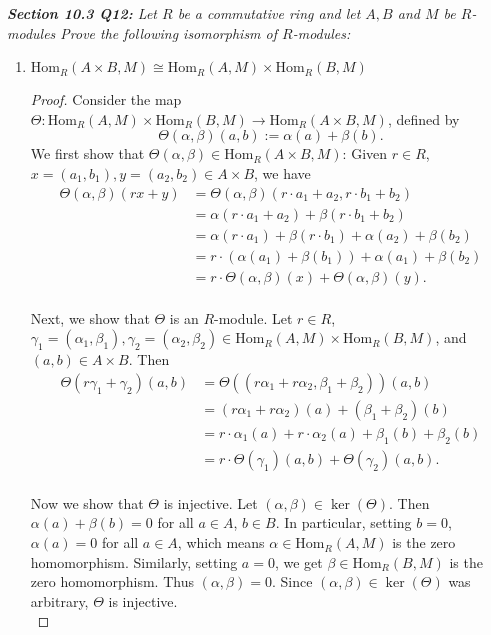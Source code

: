 \documentclass{article}
\begin{document}
\it \textbf{Section 10.3 Q12:} Let $R$ be a commutative ring and let $A,B$
  and $M$ be $R$-modules Prove the following isomorphism of $R$-modules:
  \begin{enumerate}[label={\bf(\alph*)}]
    \item $\text{Hom}_R(A\times B,M) \cong\text{Hom}_R(A,M)
      \times\text{Hom}_R(B,M)$

      \begin{proof}
        Consider the map $\Theta:\text{Hom}_R(A,M)\times\text{Hom}_R(B,M)
        \rightarrow \text{Hom}_R(A\times B,M)$, defined by
        \[\Theta(\alpha,\beta)(a,b) :=\alpha(a)+\beta(b).\]
        We first show that $\Theta(\alpha,\beta) \in\text{Hom}_R(A\times
        B,M)$: Given $r\in R$, $x=(a_1,b_1),y=(a_2,b_2)\in A\times B$, we
        have
        \begin{align*}
          \Theta(\alpha,\beta)(rx+y) &=\Theta(\alpha,\beta)(r\cdot
            a_1+a_2,r\cdot b_1+b_2)\\
          &=\alpha(r\cdot a_1+a_2) +\beta(r\cdot b_1+b_2)\\
          &=\alpha(r\cdot a_1)+\beta(r\cdot b_1) +\alpha(a_2)+\beta(b_2)\\
          &=r\cdot(\alpha(a_1)+\beta(b_1)) +\alpha(a_1)+\beta(b_2)\\
          &=r\cdot\Theta(\alpha,\beta)(x) +\Theta(\alpha,\beta)(y).\\
        \end{align*}

        Next, we show that $\Theta$ is an $R$-module. Let $r\in R$,
        $\gamma_1=(\alpha_1,\beta_1), \gamma_2=(\alpha_2,\beta_2)\in
        \text{Hom}_R(A,M)\times\text{Hom}_R(B,M)$, and $(a,b)\in A\times
        B$. Then
        \begin{align*}
          \Theta(r\gamma_1+\gamma_2)(a,b)
            &=\Theta((r\alpha_1+r\alpha_2,\beta_1+\beta_2))(a,b)\\
          &=(r\alpha_1+r\alpha_2)(a) +(\beta_1+\beta_2)(b)\\
          &=r\cdot\alpha_1(a)+r\cdot\alpha_2(a) +\beta_1(b)+\beta_2(b)\\
          &=r\cdot\Theta(\gamma_1)(a,b) +\Theta(\gamma_2)(a,b).\\
        \end{align*}

        Now we show that $\Theta$ is injective. Let
        $(\alpha,\beta)\in\ker(\Theta)$. Then $\alpha(a)+\beta(b)=0$ for
        all $a\in A$, $b\in B$. In particular, setting $b=0$, $\alpha(a)=0$
        for all $a\in A$, which means $\alpha\in\text{Hom}_R(A,M)$ is the
        zero homomorphism. Similarly, setting $a=0$, we get
        $\beta\in\text{Hom}_R(B,M)$ is the zero homomorphism. Thus
        $(\alpha,\beta)=0$. Since $(\alpha,\beta)\in\ker(\Theta)$ was
        arbitrary, $\Theta$ is injective. \\


\end{proof}
\end{enumerate}
\end{document}

